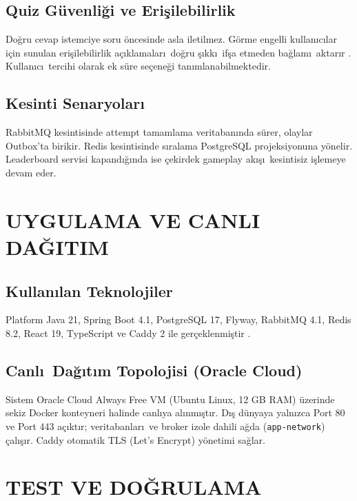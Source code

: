 \documentclass[conference,a4paper]{IEEEtran}
\begin{document}
\subsection{Quiz G\"{u}venli\u{g}i ve Eri\c{s}ilebilirlik}
Do\u{g}ru cevap istemciye soru \"{o}ncesinde asla iletilmez. G\"{o}rme engelli kullan\i c\i lar i\c{c}in sunulan eri\c{s}ilebilirlik a\c{c}\i klamalar\i\ do\u{g}ru \c{s}\i kk\i\ if\c{s}a etmeden ba\u{g}lam\i\ aktar\i r \cite{w3c2023wcag}. Kullan\i c\i\ tercihi olarak ek s\"{u}re se\c{c}ene\u{g}i tan\i mlanabilmektedir.

\subsection{Kesinti Senaryolar\i}
RabbitMQ kesintisinde attempt tamamlama veritaban\i nda s\"{u}rer, olaylar Outbox'ta birikir. Redis kesintisinde s\i ralama PostgreSQL projeksiyonuna y\"{o}nelir. Leaderboard servisi kapand\i\u{g}\i nda ise \c{c}ekirdek gameplay ak\i\c{s}\i\ kesintisiz i\c{s}lemeye devam eder.

\section{UYGULAMA VE CANLI DA\u{G}ITIM}

\subsection{Kullan\i lan Teknolojiler}
Platform Java 21, Spring Boot 4.1, PostgreSQL 17, Flyway, RabbitMQ 4.1, Redis 8.2, React 19, TypeScript ve Caddy 2 ile ger\c{c}eklenmi\c{s}tir \cite{spring2026boot, postgresql2025doc}.

\subsection{Canl\i\ Da\u{g}\i t\i m Topolojisi (Oracle Cloud)}
Sistem Oracle Cloud Always Free VM (Ubuntu Linux, 12 GB RAM) \"{u}zerinde sekiz Docker konteyneri halinde canl\i ya al\i nm\i\c{s}t\i r. D\i\c{s} d\"{u}nyaya yaln\i zca Port 80 ve Port 443 a\c{c}\i kt\i r; veritabanlar\i\ ve broker izole dahili a\u{g}da (\texttt{app-network}) \c{c}al\i\c{s}\i r. Caddy otomatik TLS (Let's Encrypt) y\"{o}netimi sa\u{g}lar.

\section{TEST VE DO\u{G}RULAMA}
\end{document}
